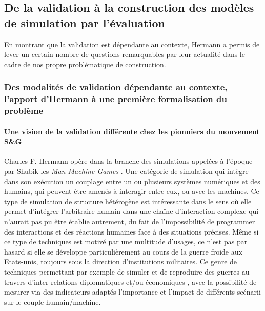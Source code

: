 
\subsection{De la validation à la construction des modèles de simulation par l'évaluation}
\label{ssec:evaluation_construction}


En montrant que la validation est dépendante au contexte, Hermann a permis de lever un certain nombre de questions remarquables par leur actualité dans le cadre de nos propre problématique de construction.  %

\subsubsection{Des modalités de validation dépendante au contexte, l'apport d'Hermann à une première formalisation du problème}

\paragraph{Une vision de la validation différente chez les pionniers du mouvement S\&G}

Charles F. Hermann opère dans la branche des simulations appelées à l'époque par Shubik les \textit{Man-Machine Games} \autocite{Shubik1972}. Une catégorie de simulation qui intègre dans son exécution un couplage entre un ou plusieurs systèmes numériques et des humains, qui peuvent être amenés à interagir entre eux, ou avec les machines. Ce type de simulation de structure hétérogène est intéressante dans le sens où elle permet d'intégrer l'arbitraire humain dans une chaîne d'interaction complexe qui n'aurait pas pu être établie autrement, du fait de l'impossibilité de programmer des interactions et des réactions humaines face à des situations précises. Même si ce type de techniques est motivé par une multitude d'usages, ce n'est pas par hasard si elle se développe particulièrement au cours de la guerre froide aux Etats-unis, toujours sous la direction d'institutions militaires. Ce genre de techniques permettant par exemple de simuler et de reproduire des guerres au travers d'inter-relations diplomatiques et/ou économiques \autocite{Hermann1967b}, avec la possibilité de mesurer via des indicateurs adaptés l'importance et l'impact de différents scénarii sur le couple humain/machine.

